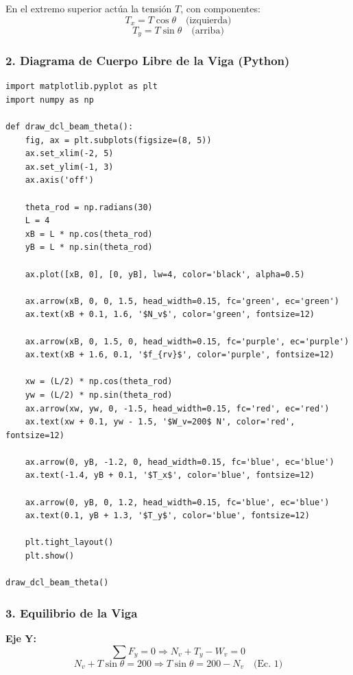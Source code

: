 \documentclass[12pt, a4paper]{article}
\begin{document}
En el extremo superior actúa la tensión $T$, con componentes:
$$T_x = T \cos\theta \quad \text{(izquierda)}$$
$$T_y = T \sin\theta \quad \text{(arriba)}$$

\subsubsection*{2. Diagrama de Cuerpo Libre de la Viga (Python)}

\begin{lstlisting}
import matplotlib.pyplot as plt
import numpy as np

def draw_dcl_beam_theta():
    fig, ax = plt.subplots(figsize=(8, 5))
    ax.set_xlim(-2, 5)
    ax.set_ylim(-1, 3)
    ax.axis('off')
    
    theta_rod = np.radians(30)
    L = 4
    xB = L * np.cos(theta_rod)
    yB = L * np.sin(theta_rod)
    
    ax.plot([xB, 0], [0, yB], lw=4, color='black', alpha=0.5)
    
    ax.arrow(xB, 0, 0, 1.5, head_width=0.15, fc='green', ec='green')
    ax.text(xB + 0.1, 1.6, '$N_v$', color='green', fontsize=12)
    
    ax.arrow(xB, 0, 1.5, 0, head_width=0.15, fc='purple', ec='purple')
    ax.text(xB + 1.6, 0.1, '$f_{rv}$', color='purple', fontsize=12)
    
    xw = (L/2) * np.cos(theta_rod)
    yw = (L/2) * np.sin(theta_rod)
    ax.arrow(xw, yw, 0, -1.5, head_width=0.15, fc='red', ec='red')
    ax.text(xw + 0.1, yw - 1.5, '$W_v=200$ N', color='red', fontsize=12)
    
    ax.arrow(0, yB, -1.2, 0, head_width=0.15, fc='blue', ec='blue')
    ax.text(-1.4, yB + 0.1, '$T_x$', color='blue', fontsize=12)
    
    ax.arrow(0, yB, 0, 1.2, head_width=0.15, fc='blue', ec='blue')
    ax.text(0.1, yB + 1.3, '$T_y$', color='blue', fontsize=12)
    
    plt.tight_layout()
    plt.show()

draw_dcl_beam_theta()
\end{lstlisting}

\subsubsection*{3. Equilibrio de la Viga}
\textbf{Eje Y:}
$$\sum F_y = 0 \Rightarrow N_v + T_y - W_v = 0$$
$$N_v + T \sin\theta = 200 \Rightarrow T \sin\theta = 200 - N_v \quad \text{(Ec. 1)}$$
\end{document}
